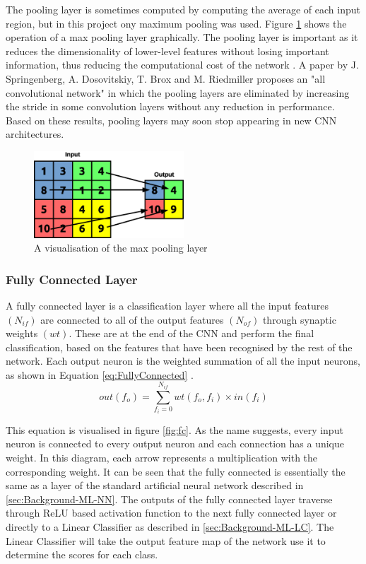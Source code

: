 \documentclass[12pt]{article}
\begin{document}
The pooling layer is sometimes computed by computing the average of each input region, but in this project ony maximum pooling was used. Figure \ref{fig:pool} shows the operation of a max pooling layer graphically. The pooling layer is important as it reduces the dimensionality of lower-level features without losing important information, thus reducing the computational cost of the network \cite{SudaFpgaAccelerator}. A paper by J. Springenberg, A. Dosovitskiy, T. Brox and M. Riedmiller proposes an "all convolutional network" in which the pooling layers are eliminated by increasing the stride in some convolution layers without any reduction in performance\cite{AllConv}. Based on these results, pooling layers may soon stop appearing in new CNN architectures.

\begin{figure} [H]
\centering
\includegraphics[width=0.5\textwidth]{figures/pool.eps}
\caption{A visualisation of the max pooling layer}
\label{fig:pool}
\end{figure}

\subsubsection{Fully Connected Layer}
\label{sec:Background-CNN-FC}


A fully connected layer is a classification layer where all the input features $(N_{if})$ are connected to all of the output features $(N_{of})$ through synaptic weights $(wt)$. These are at the end of the CNN and perform the final classification, based on the features that have been recognised by the rest of the network. Each output neuron is the weighted summation of all the input neurons, as shown in Equation \ref{eq:FullyConnected} \cite{SudaFpgaAccelerator}.
\begin{equation}
out(f_o)=\sum^{N_{if}}_{f_i=0}wt(f_o,f_i)\times in(f_i)
\label{eq:FullyConnected}
\end{equation}

This equation is visualised in figure \ref{fig:fc}. As the name suggests, every input neuron is connected to every output neuron and each connection has a unique weight. In this diagram, each arrow represents a multiplication with the corresponding weight. It can be seen that the fully connected is essentially the same as a layer of the standard artificial neural network described in \ref{sec:Background-ML-NN}. The outputs of the fully connected layer traverse through ReLU based activation function to the next fully connected layer or directly to a Linear Classifier as described in \ref{sec:Background-ML-LC}. The Linear Classifier will take the output feature map of the network use it to determine the scores for each class.
\end{document}
